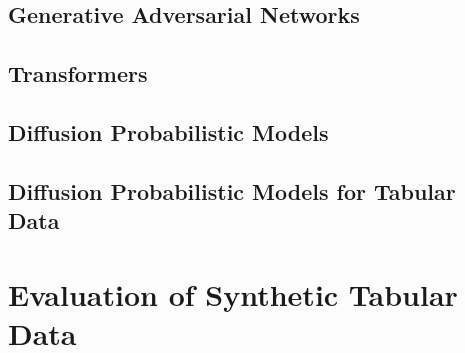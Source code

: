 

\subsection{Generative Adversarial Networks}
\label{ch:preliminaries-generativeAlgorithms-generativeAdversarialNetworks}



\subsection{Transformers}
\label{ch:preliminaries-generativeAlgorithms-transformers}



\subsection{Diffusion Probabilistic Models}
\label{ch:preliminaries-generativeAlgorithms-diffusionProbabilisticModels}


\subsection{Diffusion Probabilistic Models for Tabular Data}
\label{ch:preliminaries-generativeAlgorithms-diffusionProbabilisticModelsTabularData}



\section{Evaluation of Synthetic Tabular Data}
\label{ch:preliminaries-evaluationOfSyntheticTabularData}


